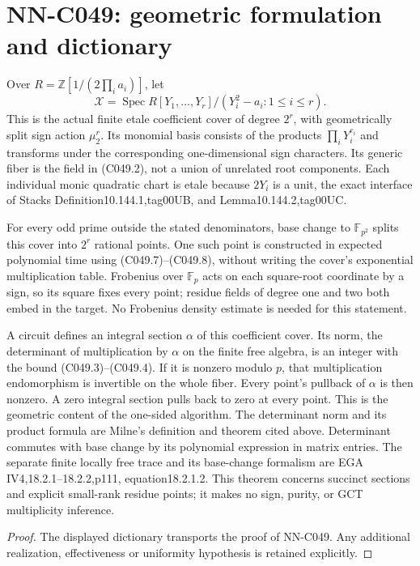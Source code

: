 \section{NN-C049: geometric formulation and dictionary}
\begin{geometricstatement}[NN-C049]
Over $R=\mathbb Z[1/(2\prod_i a_i)]$, let
\[
 \mathcal X=\operatorname{Spec}
       R[Y_1,\ldots,Y_r]/(Y_i^2-a_i:1\le i\le r).
                                                               \tag{C049.9}
\]
This is the actual finite etale coefficient cover of degree
$2^r$, with geometrically split sign action $\mu_2^r$.
Its monomial basis consists of the products
$\prod_iY_i^{e_i}$ and transforms under the corresponding
one-dimensional sign characters. Its generic fiber is the
field in (C049.2), not a union of unrelated root components.
Each individual monic quadratic chart is etale because
$2Y_i$ is a unit, the exact interface of Stacks
Definition10.144.1,tag00UB, and Lemma10.144.2,tag00UC.

For every odd prime outside the stated denominators, base
change to $\mathbb F_{p^2}$ splits this cover into $2^r$
rational points. One such point is constructed in expected
polynomial time using (C049.7)--(C049.8), without writing
the cover's exponential multiplication table. Frobenius over
$\mathbb F_p$ acts on each square-root coordinate by a sign,
so its square fixes every point; residue fields of degree
one and two both embed in the target. No Frobenius density
estimate is needed for this statement.

A circuit defines an integral section $\alpha$ of this
coefficient cover. Its norm, the determinant of multiplication
by $\alpha$ on the finite free algebra, is an integer with
the bound (C049.3)--(C049.4). If it is nonzero modulo $p$,
that multiplication endomorphism is invertible on the whole
fiber. Every point's pullback of $\alpha$ is then nonzero.
A zero integral section pulls back to zero at every point.
This is the geometric content of the one-sided algorithm.
The determinant norm and its product formula are Milne's
definition and theorem cited above. Determinant commutes with
base change by its polynomial expression in matrix entries.
The separate finite locally free trace and its base-change
formalism are EGA IV4,18.2.1--18.2.2,p111,
equation18.2.1.2. This theorem concerns
succinct sections and explicit small-rank residue points;
it makes no sign, purity, or GCT multiplicity inference.
\end{geometricstatement}
\begin{proof} The displayed dictionary transports the proof of NN-C049. Any additional realization, effectiveness or uniformity hypothesis is retained explicitly.\end{proof}



